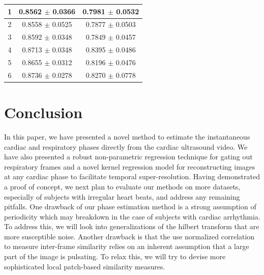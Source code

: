\documentclass[runningheads,a4paper]{llncs}
\begin{document}
\begin{table}[t]
\begin{minipage}[b]{0.45\linewidth}
\begin{tabular}{|c|c|c|}
1 & 0.8562 $\pm$ 0.0366 & 0.7981 $\pm$ 0.0532 \\ \hline
2 & 0.8558 $\pm$ 0.0525 & 0.7877 $\pm$ 0.0503 \\ \hline
3 & 0.8592 $\pm$ 0.0348 & 0.7849 $\pm$ 0.0457 \\ \hline
4 & 0.8713 $\pm$ 0.0348 & 0.8395 $\pm$ 0.0486 \\ \hline
5 & 0.8655 $\pm$ 0.0312 & 0.8196 $\pm$ 0.0476 \\ \hline
6 & 0.8736 $\pm$ 0.0278 & 0.8270 $\pm$ 0.0778 \\ \hline
\end{tabular}
\label{table:image_reconstruction}
\end{minipage}
\vspace{-0.3cm}
\end{table}
%
%
\vspace{-0.5cm}
\section{Conclusion}
\label{sec:conclusion}
%
In this paper, we have presented a novel method to estimate the instantaneous cardiac and respiratory phases directly from the cardiac ultrasound video. We have also presented a robust non-parametric regression technique for gating out respiratory frames and a novel kernel regression model for reconstructing images at any cardiac phase to facilitate temporal super-resolution. Having demonstrated a proof of concept, we next plan to evaluate our methods on more datasets, especially of subjects with irregular heart beats, and address any remaining pitfalls. One drawback of our phase estimation method is a strong assumption of periodicity which may breakdown in the case of subjects with cardiac arrhythmia. To address this, we will look into generalizations of the hilbert transform\cite{Lu2013} that are more susceptible noise. Another drawback is that the use normalized correlation to measure inter-frame similarity relies on an inherent assumption that a large part of the image is pulsating. To relax this, we will try to devise more sophisticated local patch-based similarity measures.
%
\vspace{-0.5cm}


\end{document}
